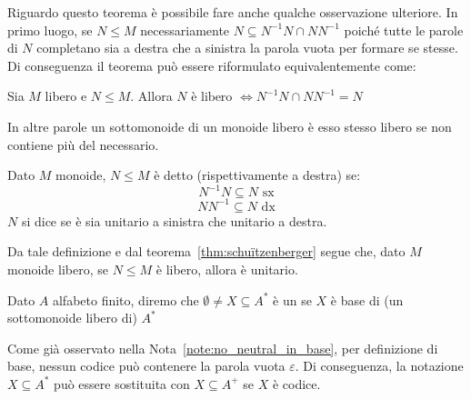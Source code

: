 Riguardo questo teorema è possibile fare anche qualche osservazione ulteriore.
In primo luogo, se \(N\leq M\) necessariamente \(N \subseteq N^{-1}N \cap NN^{-1}\) poiché tutte le parole di \(N\) completano sia a destra che a sinistra la parola vuota per formare se stesse.
Di conseguenza il teorema può essere riformulato equivalentemente come:
\begin{theorem}
  Sia \(M\) libero e \(N \leq M\). Allora \(N \text{ è libero } \iff N^{-1}N \cap NN^{-1} = N\)
\end{theorem}
In altre parole un sottomonoide di un monoide libero è esso stesso libero se non contiene più del necessario.

\begin{definition}
  Dato \(M\) monoide, \(N \leq M\) è detto  (rispettivamente a destra) se:
  \[N^{-1}N \subseteq N \text{ sx}\]
  \[NN^{-1} \subseteq N \text{ dx}\]
  \(N\) si dice  se è sia unitario a sinistra che unitario a destra.
\end{definition}

Da tale definizione e dal teorema~\ref{thm:schuïtzenberger} segue che, dato \(M\) monoide libero, se \(N \leq M\) è libero, allora è unitario.
\begin{definition}[Codice]
  Dato \(A\) alfabeto finito, diremo che \(\emptyset \neq X \subseteq A^*\) è un  se \(X\) è base di (un sottomonoide libero di) \(A^*\)
\end{definition}

\begin{note}
  Come già osservato nella Nota~\ref{note:no_neutral_in_base}, per definizione di base, nessun codice può contenere la parola vuota \(\varepsilon\).
  Di conseguenza, la notazione \(X \subseteq A^*\) può essere sostituita con \(X \subseteq A^+\) se \(X\) è codice.
\end{note}

